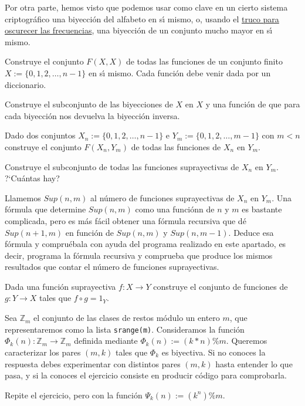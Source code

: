 Por otra parte, hemos visto que podemos usar como clave en un cierto sistema 
criptogr\'afico una biyecci\'on del alfabeto en s\'{\i} mismo, o, usando el 
\hyperref[oscurecer]{truco para oscurecer las frecuencias}, una biyecci\'on de 
un conjunto mucho mayor en s\'{\i} mismo. 
\par
\medskip
\par
\begin{ejer}
 Construye el conjunto $F(X,X)$ de todas las funciones de un conjunto finito
$X:=\{0,1,2,\dots,n-1\}$ en s\'{\i} mismo. Cada funci\'on debe venir dada
por un diccionario.
 \end{ejer}

\begin{ejer}
 Construye el subconjunto de las biyecciones de $X$ en $X$ y una
funci\'on de {\sage} que para cada biyecci\'on nos devuelva la
biyecci\'on inversa.
\end{ejer}

\begin{ejer}
 Dado dos conjuntos $X_n:=\{0,1,2,\dots,n-1\}$ e
$Y_m:=\{0,1,2,\dots,m-1\}$ con $m<n$ construye el conjunto $F(X_n,Y_m)$ de todas
las funciones de $X_n$ en $Y_m$.
\end{ejer}

\begin{ejer}
 Construye el subconjunto de todas las funciones suprayectivas de $X_n$ en
$Y_m$. ?`Cu\'antas hay?

Llamemos $Sup(n,m)$ al n\'umero de
funciones suprayectivas de $X_n$ en $Y_m$. Una f\'ormula que determine
$Sup(n,m)$ como una funci\'onn de $n$ y $m$ es bastante complicada, pero es
m\'as f\'acil obtener una f\'ormula recursiva que d\'e
$Sup(n+1,m)$ en funci\'on de $Sup(n,m)$ y $Sup(n,m-1)$. {\sc Deduce} esa
f\'ormula y {\sc compru\'ebala} con ayuda del programa realizado en
este apartado, es decir, programa la f\'ormula recursiva y comprueba que produce
los
mismos resultados que contar el n\'umero de funciones suprayectivas.
\end{ejer}

\begin{ejer}
  Dada una funci\'on suprayectiva $f:X \to Y$ construye el
conjunto de funciones de $g:Y \to X$ tales que $f\circ g=1_Y$.
\end{ejer}

\begin{ejer}
 Sea $\mathbb{Z}_m$ el conjunto de las clases de restos m\'odulo un
entero $m$, que representaremos como la lista \lstinline|srange(m)|.
Consideramos  la
funci\'on  $\Phi_k(n):\mathbb{Z}_m\to \mathbb{Z}_m$  definida
mediante $\Phi_k(n):=(k*n)\%m$. Queremos caracterizar los pares $(m,k)$ tales
que $\Phi_k$ es biyectiva. Si no conoces la respuesta debes experimentar con
distintos pares $(m,k)$ hasta entender lo que pasa, y si la conoces el ejercicio
consiste en producir c\'odigo para comprobarla.

{\sc Repite} el ejercicio, pero con la funci\'on
$\Psi_k(n):=(k^n)\%m$.
\end{ejer}

